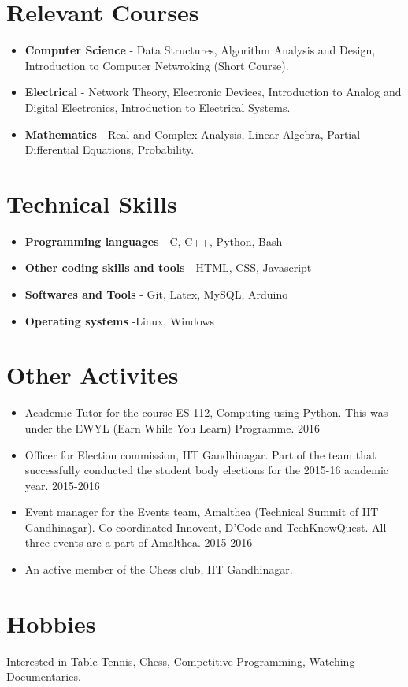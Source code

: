 \documentclass[margin, centered]{res}
\begin{document}
\begin{resume}
\section{Relevant Courses}
\begin{itemize}[leftmargin=*]
\item {\bf Computer Science} - Data Structures, Algorithm Analysis and Design, Introduction to Computer Netwroking (Short Course).
\item {\bf Electrical} - Network Theory, Electronic Devices, Introduction to Analog and Digital Electronics, Introduction to Electrical Systems.
\item {\bf Mathematics} - Real and Complex Analysis, Linear Algebra, Partial Differential Equations, Probability.
\end{itemize}

\section{Technical Skills}
\begin{itemize}[leftmargin=*]
\item {\bf Programming languages} - C, C++, Python, Bash
\item {\bf Other coding skills and tools} - HTML, CSS, Javascript
\item {\bf Softwares and Tools} - Git, Latex, MySQL, Arduino
\item {\bf Operating systems} -Linux, Windows
\end{itemize}

\section{Other Activites}
\begin{itemize}[leftmargin=*]
\item Academic Tutor for the course ES-112, Computing using Python. This was under the EWYL (Earn While You Learn) Programme.
\hfill {2016}
\item Officer for Election commission, IIT Gandhinagar. Part of the team that successfully conducted the student body elections for the 2015-16 academic year.
\hfill{2015-2016}
\item Event manager for the Events team, Amalthea (Technical Summit of IIT Gandhinagar). Co-coordinated Innovent, D’Code and TechKnowQuest. All three events are a part of Amalthea.
\hfill{2015-2016}
\item An active member of the Chess club, IIT Gandhinagar.
\end{itemize}

\section{Hobbies}Interested in Table Tennis, Chess, Competitive Programming, Watching Documentaries.

\end{resume}
\end{document}
